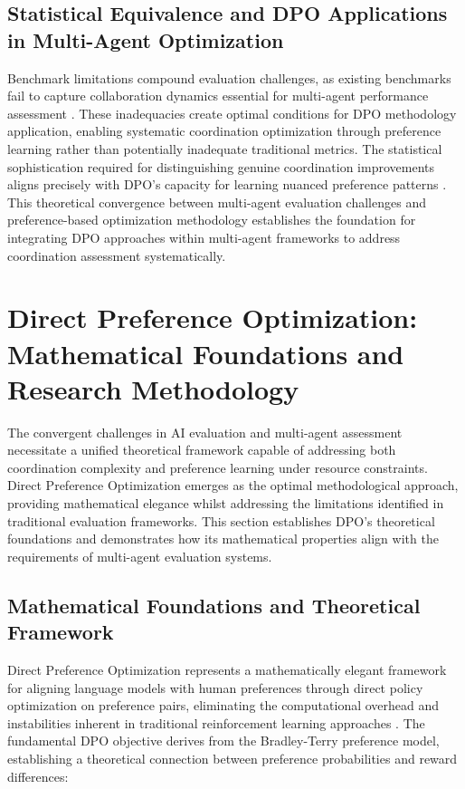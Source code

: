 \subsection{Statistical Equivalence and DPO Applications in Multi-Agent Optimization}

Benchmark limitations compound evaluation challenges, as existing benchmarks fail to capture collaboration dynamics essential for multi-agent performance assessment \cite{zhu2025multiagentbench}. These inadequacies create optimal conditions for DPO methodology application, enabling systematic coordination optimization through preference learning rather than potentially inadequate traditional metrics. The statistical sophistication required for distinguishing genuine coordination improvements aligns precisely with DPO's capacity for learning nuanced preference patterns \cite{zhang2024marlhf}. This theoretical convergence between multi-agent evaluation challenges and preference-based optimization methodology establishes the foundation for integrating DPO approaches within multi-agent frameworks to address coordination assessment systematically.

\section{Direct Preference Optimization: Mathematical Foundations and Research Methodology}

The convergent challenges in AI evaluation and multi-agent assessment necessitate a unified theoretical framework capable of addressing both coordination complexity and preference learning under resource constraints. Direct Preference Optimization emerges as the optimal methodological approach, providing mathematical elegance whilst addressing the limitations identified in traditional evaluation frameworks. This section establishes DPO's theoretical foundations and demonstrates how its mathematical properties align with the requirements of multi-agent evaluation systems.

\subsection{Mathematical Foundations and Theoretical Framework}

Direct Preference Optimization represents a mathematically elegant framework for aligning language models with human preferences through direct policy optimization on preference pairs, eliminating the computational overhead and instabilities inherent in traditional reinforcement learning approaches \cite{rafailov2023dpo}. The fundamental DPO objective derives from the Bradley-Terry preference model, establishing a theoretical connection between preference probabilities and reward differences:

